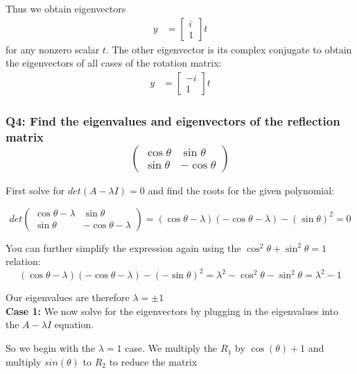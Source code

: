 \documentclass{article}
\begin{document}
Thus we obtain eigenvectors   
\begin{align}
    y &= \begin{bmatrix}
           i \\
        1
         \end{bmatrix}t 
\end{align}
for any nonzero scalar $t$. The other eigenvector is its complex conjugate to obtain the eigenvectors of all cases of the rotation matrix: 
\begin{align}
    y &= \begin{bmatrix}
           -i \\
           1
         \end{bmatrix}t 
\end{align}




\subsubsection*{Q4: Find the eigenvalues and eigenvectors of the reflection matrix
$$
\begin{pmatrix}
\cos \theta & \sin \theta \\
\sin \theta & -\cos \theta
\end{pmatrix}
$$}

First solve for $det(A- \lambda I) = 0$ and find the roots for the given polynomial:

$$
det \begin{pmatrix}
\cos \theta - \lambda & \sin \theta \\
\sin \theta & -\cos \theta - \lambda
\end{pmatrix} = (\cos \theta - \lambda) (-\cos \theta - \lambda) - (\sin \theta)^{2} = 0 
$$

You can further simplify the expression again using the $ \cos ^{2} \theta + \sin ^{2} \theta = 1$ relation:
$$
(\cos \theta - \lambda) (-\cos \theta - \lambda) - (-\sin \theta)^{2} = \lambda ^{2} - \cos ^{2} \theta - \sin ^{2} \theta = \lambda ^{2} -1
$$

Our eigenvalues are therefore $\lambda = \pm 1$ \\

\textbf{Case 1: }We now solve for the eigenvectors by plugging in the eigenvalues into the $A- \lambda I$ equation. 

So we begin with the $\lambda=1$ case. We multiply the $R_1$ by $\cos(\theta) +1$ and multiply $sin(\theta)$ to $R_2$ to reduce the matrix
\end{document}

